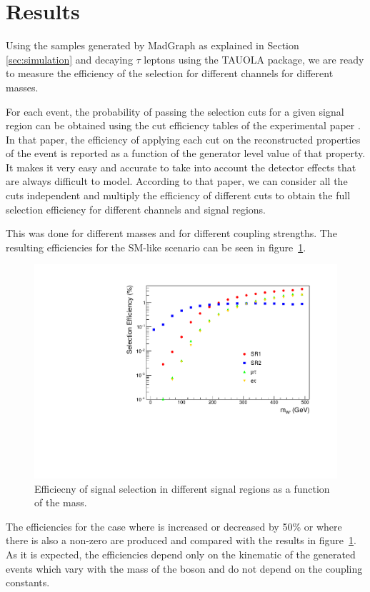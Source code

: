 \section{Results}\label{sec:results} 
Using the \wprime samples generated by MadGraph as explained in Section \ref{sec:simulation} and decaying $\tau$ leptons using the TAUOLA package, we are ready to measure the efficiency of the selection for different channels for different \wprime masses. 

For each event, the probability of passing the selection cuts for a given signal region can be obtained using the cut efficiency tables of the experimental paper \cite{Khachatryan:2016trj}. In that paper, the efficiency of applying each cut on the reconstructed properties of the event is reported as a function of the generator level value of that property. It makes it very easy and accurate to take into account the detector effects that are always difficult to model. According to that paper, we can consider all the cuts independent and multiply the efficiency of different cuts to obtain the full selection efficiency for different channels and signal regions.

This was done for different \wprime masses and for different coupling strengths. The resulting efficiencies for the SM-like scenario can be seen in figure~\ref{fig:EfficiencyGraphs}. 
\begin{figure}[!htb]
	\centering
		\includegraphics*[width=.45\textwidth]{figs/EfficiencyGraphs.pdf}
	\caption{Efficiecny of signal selection in different signal regions as a function of the \wprime mass.}
	\label{fig:EfficiencyGraphs}
\end{figure}
The efficiencies for the case where \gL is increased or decreased by 50\% or where there is also a non-zero \gR are produced and compared with the results in 
figure~\ref{fig:EfficiencyGraphs}. As it is expected, the efficiencies depend only on the kinematic of the generated events which vary with the mass of the \wprime boson and do not depend on the coupling constants.
 
